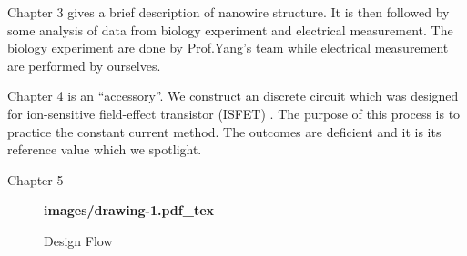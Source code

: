 Chapter 3 gives a brief description of nanowire structure.
It is then followed by some analysis of data from biology experiment and electrical measurement.
The biology experiment are done by Prof.Yang's team while electrical measurement are performed by ourselves.

Chapter 4 is an ``accessory''.
We construct an discrete circuit which was designed for ion-sensitive field-effect transistor (ISFET) \cite{SF1}.
The purpose of this process is to practice the constant current method.
The outcomes are deficient and it is its reference value which we spotlight.

{\color{red}Chapter 5}


\begin{figure}[!htbp]
    \centering
    {\selectfont\textbf{
        \def\svgwidth{5.0cm}
        \fontsize{6}{7}\selectfont
         {images/drawing-1.pdf_tex}
    }}
    \fontsize{6}{7}\selectfont
    \caption{Design Flow}
    \label{fig:designFlow}
\end{figure}





%
%
%
%

%
%





